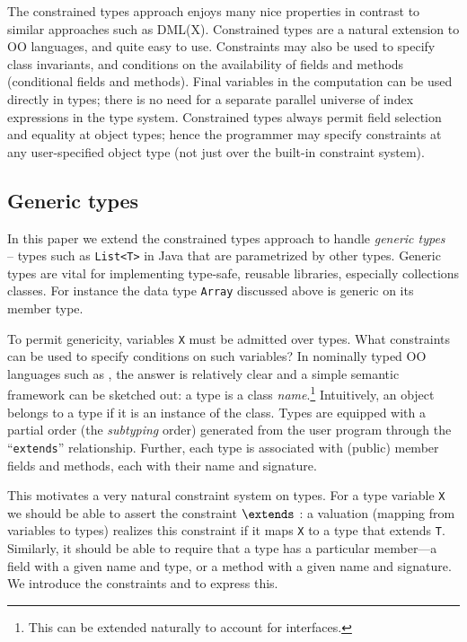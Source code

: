 The constrained types approach enjoys many nice properties in contrast
to similar approaches such as DML(X)\cite{xi99dependent}.  Constrained
types are a natural extension to OO languages, and quite easy to
use. Constraints may also be used to specify class invariants, and
conditions on the availability of fields and methods (conditional
fields and methods).  Final variables in the computation can be used
directly in types; there is no need for a separate parallel universe
of index expressions in the type system.  Constrained types always
permit field selection and equality at object types; hence the
programmer may specify constraints at any user-specified object type
(not just over the built-in constraint system).  


\subsection{Generic types}

In this paper we extend the constrained types approach to handle {\em
generic
types}~\cite{clu,ada,GJ,java-popl97,thorup97,Java3,csharp-generics} --
types such as {\tt List<T>} in Java that are parametrized by other
types. Generic types are vital for implementing type-safe, reusable
libraries, especially collections classes. For instance the data type
{\tt Array} discussed above is generic on its member type.

To permit genericity, variables {\tt X} must be admitted over types.
What constraints can be used to specify conditions on such variables?
In nominally typed OO languages such as \Java, the answer is
relatively clear and a simple semantic framework can be sketched out:
a type is a class {\em name}.\footnote{This can be extended naturally
to account for interfaces.} Intuitively, an object belongs to a type
if it is an instance of the class. Types are equipped with a partial
order (the {\em subtyping} order) generated from the user program
through the ``{\tt extends}'' relationship.  Further, each type is
associated with (public) member fields and methods, each with their
name and signature.
%

This motivates a very natural constraint system on types.  For a type
variable {\tt X} we should be able to assert the constraint 
$\extends$ : a valuation (mapping from variables to types) realizes
this constraint if it maps {\tt X} to a type that extends {\tt T}.
Similarly, it should be able to require that a type has a
particular member---a field with a given name and type, or a method
with a given name and signature. We introduce the constraints 
 and  to express this.

